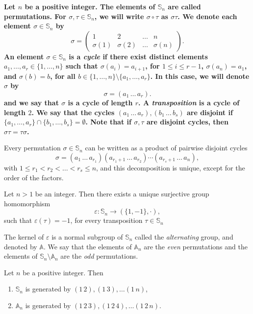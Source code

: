 {\bf Let $n$ be a positive integer. The elements of $\mathbb{S}_n$ are called permutations. For $\sigma,\tau\in\mathbb{S}_n$, 
we will write $\sigma\circ\tau$ as $\sigma\tau$. 
We denote each element $\sigma\in\mathbb{S}_n$ by
\[ \sigma=\left(\begin{array}{cccc}
1&2&\ldots&n\\
\sigma(1)&\sigma(2)&\ldots&\sigma(n)\end{array}\right).\]
An element $\sigma\in \mathbb{S}_n$ is a {\em cycle} if there exist distinct elements 
$a_1,\dots ,a_r\in\{ 1,\dots, n\}$ such that $\sigma(a_i)=a_{i+1}$, for $1\leq i\leq r-1$, $\sigma(a_n)=a_1$, and $\sigma(b)=b$, 
for all $b\in \{1,\dots , n\}\setminus\{ a_1,\dots ,a_r\}$. In this case, we will denote $\sigma$ by
\[ \sigma=(a_1\,\dots\, a_r).\]
and we say that $\sigma$ is a cycle of length $r$. A {\em transposition} is a cycle of length $2$. We say that the cycles
$(a_1\,\dots\, a_r),(b_1\,\dots\, b_s)$ are disjoint if $\{ a_1,\dots, a_r\}\cap \{ b_1,\dots, b_s\}=\emptyset$. 
Note that if $\sigma,\tau$ are disjoint cycles, then $\sigma\tau=\tau\sigma$.

\begin{theorem}
    Every permutation $\sigma\in\mathbb{S}_n$ can be written as a product of pairwise disjoint cycles
    \[ \sigma=(a_1\,\dots\, a_{r_1})(a_{r_1+1}\,\dots\, a_{r_2})\cdots (a_{r_s+1}\,\dots\, a_n),\]
    with $1\leq r_1<r_2<\dots<r_s\leq n$, and this decomposition is unique, except for the order of the factors.
\end{theorem}

\begin{theorem}
    Let $n>1$ be an integer. Then there exists a unique surjective group homomorphism 
    \[ \varepsilon\colon \mathbb{S}_n\rightarrow (\{ 1,-1\},\cdot),\]
    such that $\varepsilon(\tau)=-1$, for every transposition $\tau\in\mathbb{S}_n$
\end{theorem}

The kernel of $\varepsilon$ is a normal subgroup of $\mathbb{S}_n$ called the {\em alternating} group, and denoted by $\mathbb{A}$.
We say that the elements of $\mathbb{A}_n$ are the {\em even} permutations and the elements of $\mathbb{S}_n\setminus\mathbb{A}_n$
are the {\em odd} permutations.

\begin{theorem}
Let $n$ be a positive integer. Then    
\begin{enumerate}
    \item $\mathbb{S}_n$ is generated by $(1\, 2),(1\, 3),\dots (1\, n)$,
    \item $\mathbb{A}_n$ is generated by $(1\, 2\, 3),(1\, 2\, 4),\dots (1\, 2\, n)$.
    \end{enumerate}
\end{theorem}

}

